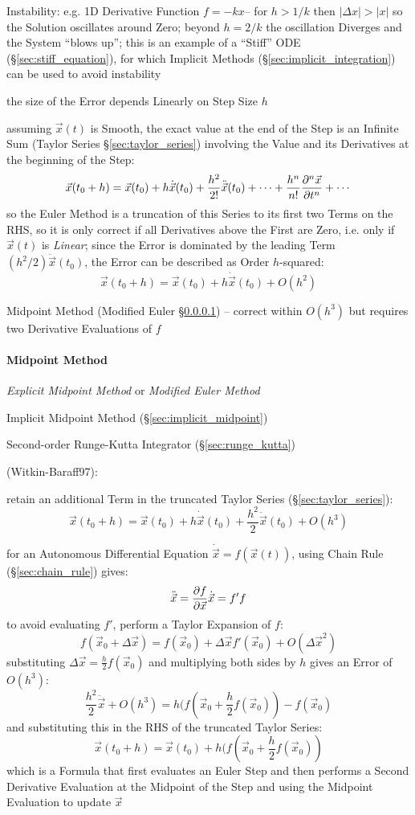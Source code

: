 Instability: e.g. 1D Derivative Function $f = -kx$-- for $h > 1/k$ then
$|\Delta{x}| > |x|$ so the Solution oscillates around Zero; beyond $h = 2/k$ the
oscillation Diverges and the System ``blows up''; this is an example of a
``Stiff'' ODE (\S\ref{sec:stiff_equation}), for which Implicit Methods
(\S\ref{sec:implicit_integration}) can be used to avoid instability

the size of the Error depends Linearly on Step Size $h$

assuming $\vec{x}(t)$ is Smooth, the exact value at the end of the Step is an
Infinite Sum (Taylor Series \S\ref{sec:taylor_series}) involving the Value and
its Derivatives at the beginning of the Step:
\[
  \vec{x}(t_0 + h) = \vec{x}(t_0) + h\dot{\vec{x}}(t_0) +
    \frac{h^2}{2!}\ddot{\vec{x}}(t_0) + \cdots +
    \frac{h^n}{n!}\frac{\partial{^n\vec{x}}}{\partial{t^n}} + \cdots
\]
so the Euler Method is a truncation of this Series to its first two Terms on the
RHS, so it is only correct if all Derivatives above the First are Zero, i.e.
only if $\vec{x}(t)$ is \emph{Linear}; since the Error is dominated by the
leading Term $(h^2/2)\ddot{\vec{x}}(t_0)$, the Error can be described as Order
$h$-squared:
\[
  \vec{x}(t_0 + h) = \vec{x}(t_0) + h\dot{\vec{x}}(t_0) + O(h^2)
\]

Midpoint Method (Modified Euler \S\ref{sec:midpoint_method}) -- correct within
$O(h^3)$ but requires two Derivative Evaluations of $f$



\paragraph{Midpoint Method}\label{sec:midpoint_method}\hfill

\emph{Explicit Midpoint Method} or \emph{Modified Euler Method}

\fist Implicit Midpoint Method (\S\ref{sec:implicit_midpoint})

Second-order Runge-Kutta Integrator (\S\ref{sec:runge_kutta})

(Witkin-Baraff97):

retain an additional Term in the truncated Taylor Series
(\S\ref{sec:taylor_series}):
\[
  \vec{x}(t_0 + h) = \vec{x}(t_0) + h\dot{\vec{x}}(t_0) +
    \frac{h^2}{2}\ddot{\vec{x}}(t_0) + O(h^3)
\]

for an Autonomous Differential Equation $\dot{\vec{x}} = f(\vec{x}(t))$, using
Chain Rule (\S\ref{sec:chain_rule}) gives:
\[
  \ddot{\vec{x}} = \frac{\partial{f}}{\partial{\vec{x}}}\dot{\vec{x}} = f' f
\]
to avoid evaluating $f'$, perform a Taylor Expansion of $f$:
\[
  f(\vec{x}_0 + \Delta{\vec{x}}) =
    f(\vec{x}_0) + \Delta\vec{x}f'(\vec{x}_0) + O(\Delta\vec{x}^2)
\]
substituting $\Delta{\vec{x}} = \frac{h}{2} f(\vec{x}_0)$ and multiplying both
sides by $h$ gives an Error of $O(h^3)$:
\[
  \frac{h^2}{2}\ddot{\vec{x}} + O(h^3) =
    h(f(\vec{x}_0 + \frac{h}{2}f(\vec{x}_0)) - f(\vec{x}_0)
\]
and substituting this in the RHS of the truncated Taylor Series:
\[
  \vec{x}(t_0 + h) = \vec{x}(t_0) + h(f(\vec{x}_0 + \frac{h}{2}f(\vec{x}_0))
\]
which is a Formula that first evaluates an Euler Step and then performs a Second
Derivative Evaluation at the Midpoint of the Step and using the Midpoint
Evaluation to update $\vec{x}$



